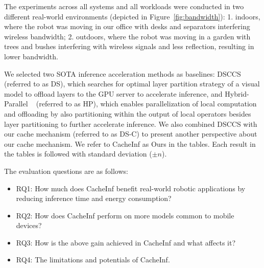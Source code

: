The experiments across all systems and all workloads were conducted in two different real-world environments (depicted in Figure~\ref{fig:bandwidth}): 1. indoors, where the robot was moving in our office with desks and separators interfering wireless bandwidth;
2. outdoors, where the robot was moving in a garden with trees and bushes interfering with wireless signals and less reflection, resulting in lower bandwidth. 

We selected two SOTA inference acceleration methods as baselines: DSCCS~\cite{liang2023dnn} (referred to as DS), which searches for optimal layer partition strategy of a visual model to offload layers to the GPU server to accelerate inference, and Hybrid-Parallel ~\cite{sun2024hybridparallel} (referred to as HP), which enables parallelization of local computation and offloading by also partitioning within the output of local operators besides layer partitioning to further accelerate inference. 
We also combined DSCCS with our cache mechanism (referred to as DS-C) to present another perspective about our cache mechanism.
We refer to CacheInf as Ours in the tables.
Each result in the tables is followed with standard deviation ($\pm n$).

The evaluation questions are as follows:
\begin{itemize}
    \item RQ1: How much does CacheInf benefit real-world robotic applications by reducing inference time and energy consumption?
    \item RQ2: How does CacheInf perform on more models common to mobile devices?
    \item RQ3: How is the above gain achieved in CacheInf and what affects it?
    \item RQ4: The limitations and potentials of CacheInf.
\end{itemize}

